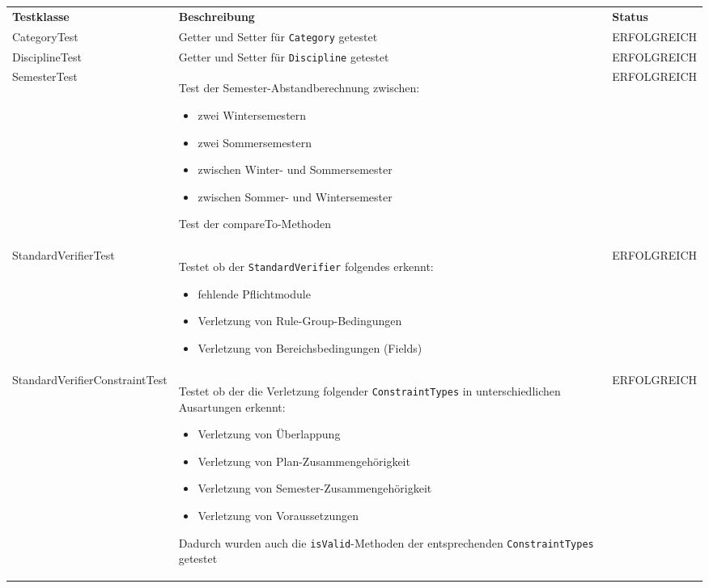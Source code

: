 \begin{longtable}{| >{\hspace{0pt}} p{} | >{\hspace{0pt}} p{} | >{\hspace{0pt}} p{} |}
	\hline
	\textbf{Testklasse} & \textbf{Beschreibung} & \textbf{Status} \\ 
	\hhline{|=|=|=|}  
	\endfirsthead
	\endhead
	CategoryTest & Getter und Setter für \texttt{Category} getestet & ERFOLGREICH \\
	\hline
	DisciplineTest & Getter und Setter für \texttt{Discipline} getestet & ERFOLGREICH \\
	\hline
	SemesterTest & Test der Semester-Abstandberechnung zwischen:
	\begin{itemize}
		\item zwei Wintersemestern
		\item zwei Sommersemestern
		\item zwischen Winter- und Sommersemester
		\item zwischen Sommer- und Wintersemester
	\end{itemize}
	Test der compareTo-Methoden & ERFOLGREICH \\
	\hline
	StandardVerifierTest & Testet ob der \texttt{StandardVerifier} folgendes erkennt:
	\begin{itemize}
		\item fehlende Pflichtmodule
		\item Verletzung von Rule-Group-Bedingungen
		\item Verletzung von Bereichsbedingungen (Fields)
	\end{itemize} & ERFOLGREICH \\
	\hline
	StandardVerifierConstraintTest & Testet ob der die Verletzung folgender \texttt{ConstraintTypes} in unterschiedlichen Ausartungen erkennt:
	\begin{itemize}
		\item Verletzung von Überlappung 
		\item Verletzung von Plan-Zusammengehörigkeit 
		\item Verletzung von Semester-Zusammengehörigkeit 
		\item Verletzung von Voraussetzungen
	\end{itemize}
	Dadurch wurden auch die \texttt{isValid}-Methoden der entsprechenden \texttt{ConstraintTypes} getestet & ERFOLGREICH \\
	\hline
	
\end{longtable}

